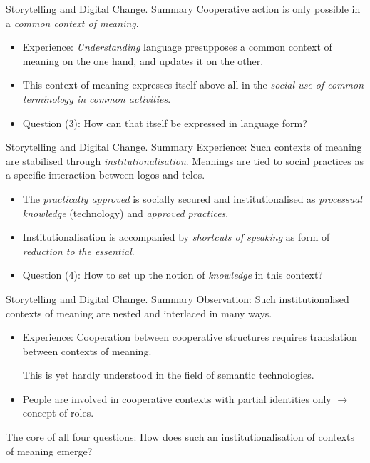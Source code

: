 \documentclass{beamer}
\begin{document}
\begin{frame}{Storytelling and Digital Change. Summary}
Cooperative action is only possible in a \emph{common context of meaning}.
\begin{itemize}
\item Experience: \emph{Understanding} language presupposes a common context
  of meaning on the one hand, and updates it on the other.
\item This context of meaning expresses itself above all in the \emph{social
  use of common terminology in common activities}.
\item Question (3): How can that itself be expressed in language form?
\end{itemize}
\end{frame}
\begin{frame}{Storytelling and Digital Change. Summary}
Experience: Such contexts of meaning are stabilised through
\emph{institutionalisation}. Meanings are tied to social practices as a
specific interaction between logos and telos.
\begin{itemize}
\item The \emph{practically approved} is socially secured and
  institutionalised as \emph{processual knowledge} (technology) and
  \emph{approved practices}.
\item Institutionalisation is accompanied by \emph{shortcuts of speaking} as
  form of \emph{reduction to the essential}. 
\item Question (4): How to set up the notion of \emph{knowledge} in this
  context?
\end{itemize}\vspace*{2em}
\end{frame}
\begin{frame}{Storytelling and Digital Change. Summary}
Observation: Such institutionalised contexts of meaning are nested and
interlaced in many ways.
\begin{itemize}
\item Experience: Cooperation between cooperative structures requires
  translation between contexts of meaning.

  This is yet hardly understood in the field of semantic technologies.
\item People are involved in cooperative contexts with partial identities only
  $\to$ concept of roles.
\end{itemize}
The core of all four questions: How does such an institutionalisation of
contexts of meaning emerge?
\end{frame}
\end{document}
